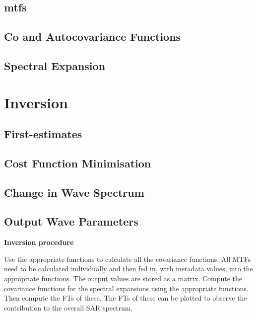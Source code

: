 \subsection{\acfp{mtf}} \label{subsec:systemDesign.sarSpectrum.mtfs}

\subsection{Co and Autocovariance Functions} \label{subsec:systemDesign.sarSpectrum.coAutoFunc}

\subsection{Spectral Expansion} \label{subsec:systemDesign.sarSpectrum.spectralExpan}



\section{Inversion} \label{sec:systemDesign.inversion}

\subsection{First-estimates} \label{subsec:systemDesign.inversion.firstEstimates}

\subsection{Cost Function Minimisation} \label{subsec:systemDesign.inversion.costFuncMinimise}


\subsection{Change in Wave Spectrum} \label{subsec:systemDesign.inversion.changeWaveSpectrum}


\subsection{Output Wave Parameters} \label{subsec:systemDesign.inversion.outputWaveParams}



\textbf{Inversion procedure}

Use the appropriate functions to calculate all the covariance functions. All MTFs need to be calculated individually and then fed in, with metadata values, into the appropriate functions. The output values are stored as a matrix. Compute the covariance functions for the spectral expansions using the appropriate functions. Then compute the FTs of these. The FTs of these can be plotted to observe the contribution to the overall SAR spectrum. 

